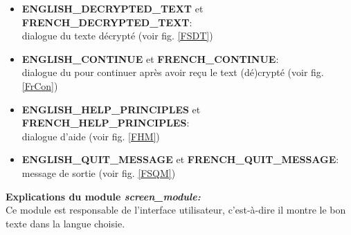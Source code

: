\documentclass[a4paper,12pt,abstracton,titlepage]{scrartcl}
\begin{document}
{\begin{itemize}
dialogue du texte crypté (voir fig. \ref{FSCT})\\
\item \textbf{ENGLISH\_DECRYPTED\_TEXT} et \textbf{FRENCH\_DECRYPTED\_TEXT}:\\
dialogue du texte décrypté (voir fig. \ref{FSDT})\\
\item \textbf{ENGLISH\_CONTINUE} et \textbf{FRENCH\_CONTINUE}:\\
dialogue du pour continuer après avoir reçu le text (dé)crypté (voir fig. \ref{FrCon})\\
\item \textbf{ENGLISH\_HELP\_PRINCIPLES} et \textbf{FRENCH\_HELP\_PRINCIPLES}:\\
dialogue d'aide (voir fig. \ref{FHM})\\
\item \textbf{ENGLISH\_QUIT\_MESSAGE} et \textbf{FRENCH\_QUIT\_MESSAGE}:\\
message de sortie (voir fig. \ref{FSQM})\\
\end{itemize}

\textbf{Explications du module \textit{screen\_module:}}\\
Ce module est responsable de l'interface utilisateur, c'est-à-dire il montre le bon texte dans la langue choisie.
\vspace{0.3cm}

}
\end{document}
